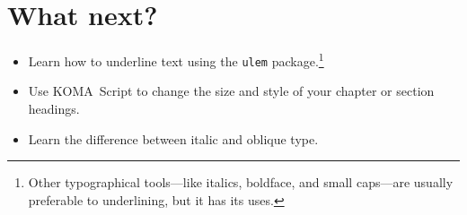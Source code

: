 \section{What next?}
\begin{itemize}
\item Learn how to underline text using the \texttt{ulem}
    package.\punckern\footnote{Other typographical tools---like italics,
    boldface, and small caps---are usually preferable to underlining,
    but it has its uses.}
\item Use KOMA~Script to change the size and style of your chapter or section
    headings.
\item Learn the difference between italic and oblique type.
\end{itemize}
